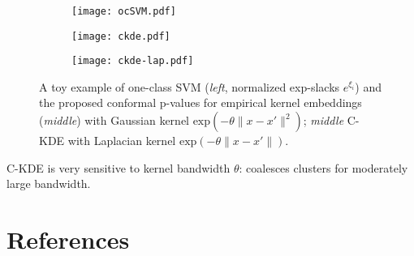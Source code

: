 \documentclass[t]{beamer}  %
\begin{document}
\begin{frame}[c, shrink=0]\frametitle{\insertsection}
  \framesubtitle{\insertsubsection}
  \begin{figure}%
    \centering
    \begin{subfigure}[b]{0.33\linewidth}
      \texttt{[image: ocSVM.pdf]}
    \end{subfigure}%
    \begin{subfigure}[b]{0.33\linewidth}
      \texttt{[image: ckde.pdf]}
    \end{subfigure}%
    \begin{subfigure}[b]{0.33\linewidth}
      \texttt{[image: ckde-lap.pdf]}
    \end{subfigure}%
    \caption{A toy example of one-class SVM (\textit{left}, normalized exp-slacks
    $e^{\xi_i}$) and the proposed conformal p-values for empirical kernel embeddings
    (\textit{middle}) with Gaussian kernel $\text{exp}(-\theta\|x-x'\|^2)$;
    \textit{middle} C-KDE with Laplacian kernel $\text{exp}(-\theta\|x-x'\|)$.}
    \label{fig:gauss_1d_prof_gpr}
  \end{figure}
  C-KDE is very sensitive to kernel bandwidth $\theta$: coalesces clusters for
  moderately large bandwidth.
\end{frame}



\section{References} %
\label{sec:references}

\begin{frame}[t, shrink=25]\frametitle{\insertsection}
  \printbibliography
\end{frame}

\end{document}
